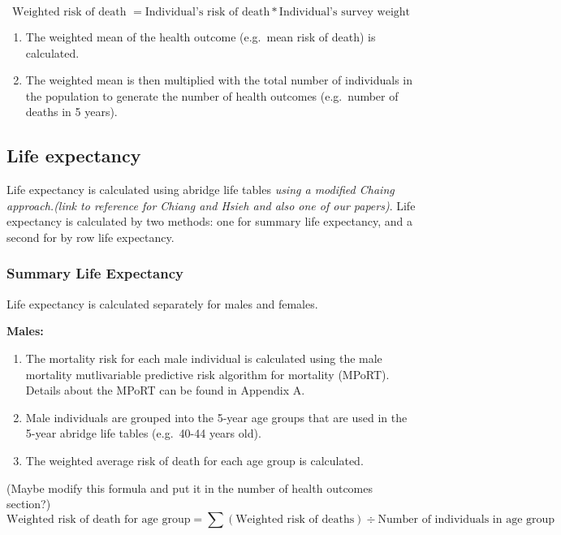 \documentclass[]{book}
\providecommand{\tightlist}{%
  \setlength{\itemsep}{0pt}\setlength{\parskip}{0pt}}
\begin{document}
\[ \text{Weighted risk of death } = \text{Individual's risk of death}*\text{Individual's survey weight}\]

\begin{enumerate}
\def\labelenumi{\arabic{enumi}.}
\setcounter{enumi}{2}
\tightlist
\item
  The weighted mean of the health outcome (e.g.~mean risk of death) is
  calculated.
\item
  The weighted mean is then multiplied with the total number of
  individuals in the population to generate the number of health
  outcomes (e.g.~number of deaths in 5 years).
\end{enumerate}

\subsection{Life expectancy}\label{life-expectancy}

Life expectancy is calculated using abridge life tables \emph{using a
modified Chaing approach.(link to reference for Chiang and Hsieh and
also one of our papers)}. Life expectancy is calculated by two methods:
one for summary life expectancy, and a second for by row life
expectancy.

\subsubsection{Summary Life Expectancy}\label{summary-life-expectancy}

Life expectancy is calculated separately for males and females.

\textbf{Males:}

\begin{enumerate}
\def\labelenumi{\arabic{enumi}.}
\item
  The mortality risk for each male individual is calculated using the
  male mortality mutlivariable predictive risk algorithm for mortality
  (MPoRT). Details about the MPoRT can be found in Appendix A.
\item
  Male individuals are grouped into the 5-year age groups that are used
  in the 5-year abridge life tables (e.g.~40-44 years old).
\item
  The weighted average risk of death for each age group is calculated.
\end{enumerate}

(Maybe modify this formula and put it in the number of health outcomes
section?)
\[ \text{Weighted risk of death for age group} = \sum(\text{Weighted risk of deaths}) \div \text{Number of individuals in age group}\]
\end{document}
